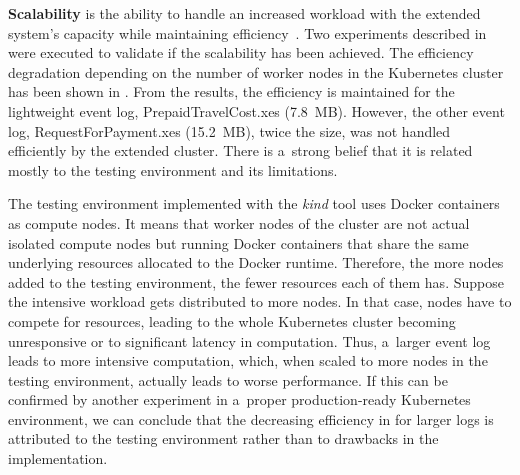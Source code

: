 \documentclass[12pt]{article}
\begin{document}
\textbf{Scalability} is the ability to handle an increased workload with the extended system's capacity while maintaining efficiency~\cite{weinstock_system_2006}. Two experiments described in  were executed to validate if the scalability has been achieved. The efficiency degradation depending on the number of worker nodes in the Kubernetes cluster has been shown in . From the results, the efficiency is maintained for the lightweight event log, PrepaidTravelCost.xes (7.8~MB). However, the other event log, RequestForPayment.xes (15.2~MB), twice the size, was not handled efficiently by the extended cluster. There is a~strong belief that it is related mostly to the testing environment and its limitations.

The testing environment implemented with the \emph{kind} tool uses Docker containers as compute nodes. It means that worker nodes of the cluster are not actual isolated compute nodes but running Docker containers that share the same underlying resources allocated to the Docker runtime. Therefore, the more nodes added to the testing environment, the fewer resources each of them has. Suppose the intensive workload gets distributed to more nodes. In that case, nodes have to compete for resources, leading to the whole Kubernetes cluster becoming unresponsive or to significant latency in computation. Thus, a~larger event log leads to more intensive computation, which, when scaled to more nodes in the testing environment, actually leads to worse performance. If this can be confirmed by another experiment in a~proper production-ready Kubernetes environment, we can conclude that the decreasing efficiency in  for larger logs is attributed to the testing environment rather than to drawbacks in the implementation.
\end{document}
